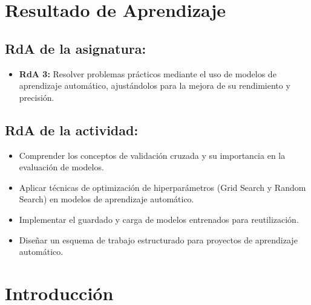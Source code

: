 \documentclass[a4,11pt]{aleph-notas}
\begin{document}
\encabezado


\section*{Resultado de Aprendizaje}

\subsection*{RdA de la asignatura:}
\begin{itemize}[leftmargin=*]
    \item \textbf{RdA 3:} 
    Resolver problemas prácticos mediante el uso de modelos de aprendizaje automático, ajustándolos para la mejora de su rendimiento y precisión.
\end{itemize}

\subsection*{RdA de la actividad:}
\begin{itemize}[leftmargin=*]
    \item Comprender los conceptos de validación cruzada y su importancia en la evaluación de modelos.
    \item Aplicar técnicas de optimización de hiperparámetros (Grid Search y Random Search) en modelos de aprendizaje automático.
    \item Implementar el guardado y carga de modelos entrenados para reutilización.
    \item Diseñar un esquema de trabajo estructurado para proyectos de aprendizaje automático.
\end{itemize}

\section*{Introducción}
\end{document}
